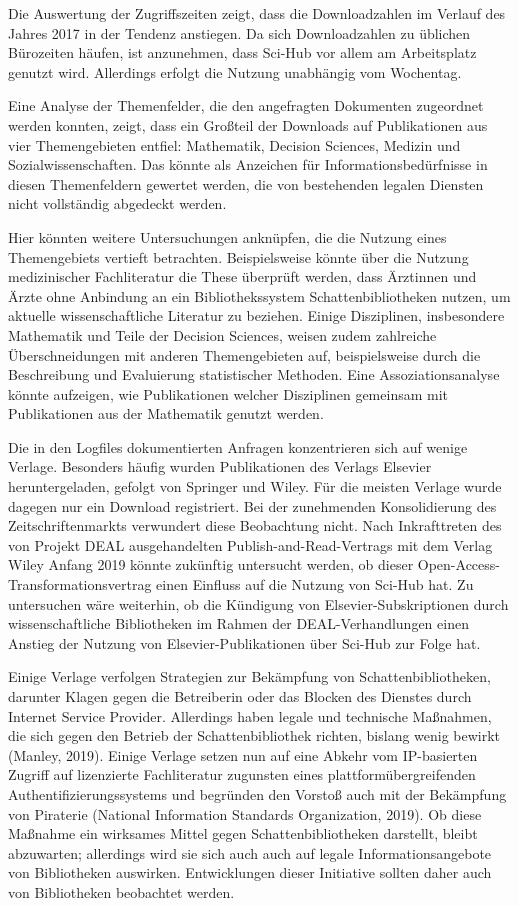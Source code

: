 \documentclass[a4paper,
fontsize=11pt,
oneside,
numbers=noperiodatend,
parskip=half-,
bibliography=totoc,
final
]{scrartcl}
\begin{document}
Die Auswertung der Zugriffszeiten zeigt, dass die Downloadzahlen im
Verlauf des Jahres 2017 in der Tendenz anstiegen. Da sich Downloadzahlen
zu üblichen Bürozeiten häufen, ist anzunehmen, dass Sci-Hub vor allem am
Arbeitsplatz genutzt wird. Allerdings erfolgt die Nutzung unabhängig vom
Wochentag.

Eine Analyse der Themenfelder, die den angefragten Dokumenten zugeordnet
werden konnten, zeigt, dass ein Großteil der Downloads auf Publikationen
aus vier Themengebieten entfiel: Mathematik, Decision Sciences, Medizin
und Sozialwissenschaften. Das könnte als Anzeichen für
Informationsbedürfnisse in diesen Themenfeldern gewertet werden, die von
bestehenden legalen Diensten nicht vollständig abgedeckt werden.

Hier könnten weitere Untersuchungen anknüpfen, die die Nutzung eines
Themengebiets vertieft betrachten. Beispielsweise könnte über die
Nutzung medizinischer Fachliteratur die These überprüft werden, dass
Ärztinnen und Ärzte ohne Anbindung an ein Bibliothekssystem
Schattenbibliotheken nutzen, um aktuelle wissenschaftliche Literatur zu
beziehen. Einige Disziplinen, insbesondere Mathematik und Teile der
Decision Sciences, weisen zudem zahlreiche Überschneidungen mit anderen
Themengebieten auf, beispielsweise durch die Beschreibung und
Evaluierung statistischer Methoden. Eine Assoziationsanalyse könnte
aufzeigen, wie Publikationen welcher Disziplinen gemeinsam mit
Publikationen aus der Mathematik genutzt werden.

Die in den Logfiles dokumentierten Anfragen konzentrieren sich auf
wenige Verlage. Besonders häufig wurden Publikationen des Verlags
Elsevier heruntergeladen, gefolgt von Springer und Wiley. Für die
meisten Verlage wurde dagegen nur ein Download registriert. Bei der
zunehmenden Konsolidierung des Zeitschriftenmarkts verwundert diese
Beobachtung nicht. Nach Inkrafttreten des von Projekt DEAL
ausgehandelten Publish-and-Read-Vertrags mit dem Verlag Wiley Anfang
2019 könnte zukünftig untersucht werden, ob dieser
Open-Access-Transformationsvertrag einen Einfluss auf die Nutzung von
Sci-Hub hat. Zu untersuchen wäre weiterhin, ob die Kündigung von
Elsevier-Subskriptionen durch wissenschaftliche Bibliotheken im Rahmen
der DEAL-Verhandlungen einen Anstieg der Nutzung von
Elsevier-Publikationen über Sci-Hub zur Folge hat.

Einige Verlage verfolgen Strategien zur Bekämpfung von
Schattenbibliotheken, darunter Klagen gegen die Betreiberin oder das
Blocken des Dienstes durch Internet Service Provider. Allerdings haben
legale und technische Maßnahmen, die sich gegen den Betrieb der
Schattenbibliothek richten, bislang wenig bewirkt (Manley, 2019). Einige
Verlage setzen nun auf eine Abkehr vom IP-basierten Zugriff auf
lizenzierte Fachliteratur zugunsten eines plattformübergreifenden
Authentifizierungssystems und begründen den Vorstoß auch mit der
Bekämpfung von Piraterie (National Information Standards Organization,
2019). Ob diese Maßnahme ein wirksames Mittel gegen Schattenbibliotheken
darstellt, bleibt abzuwarten; allerdings wird sie sich auch auch auf
legale Informationsangebote von Bibliotheken auswirken. Entwicklungen
dieser Initiative sollten daher auch von Bibliotheken beobachtet werden.
\end{document}

